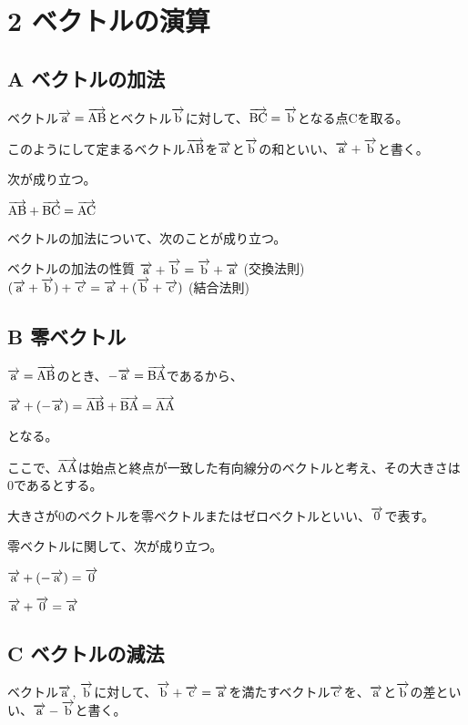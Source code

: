 \documentclass[pulatex,dvpdfmx,a4paper]{jsarticle}
\newcommand{\bekutoru}[1]{\overrightarrow{\rm #1}}
\begin{document}
\section*{2 ベクトルの演算}
\subsection*{A ベクトルの加法}

ベクトル$\bekutoru{a}=\bekutoru{AB}$とベクトル$\bekutoru{b}$に対して、$\bekutoru{BC}=\bekutoru{b}$となる点Cを取る。\par
このようにして定まるベクトル$\bekutoru{AB}$を$\bekutoru{a}$と$\bekutoru{b}$の和といい、$\bekutoru{a}+\bekutoru{b}$と書く。\par
次が成り立つ。
\begin{screen}
  $\bekutoru{AB}+\bekutoru{BC}=\bekutoru{AC}$
\end{screen}

ベクトルの加法について、次のことが成り立つ。
\begin{itembox}[l]{ベクトルの加法の性質}
  $\bekutoru{a}+\bekutoru{b}=\bekutoru{b}+\bekutoru{a}$ (交換法則)
  $(\bekutoru{a}+\bekutoru{b})+\bekutoru{c}=\bekutoru{a}+(\bekutoru{b}+\bekutoru{c})$ (結合法則)
\end{itembox}

\subsection*{B 零ベクトル}
$\bekutoru{a}=\bekutoru{AB}$のとき、$-\bekutoru{a}=\bekutoru{BA}$であるから、\par
$\bekutoru{a}+(-\bekutoru{a})=\bekutoru{AB}+\bekutoru{BA}=\bekutoru{AA}$\par となる。\par
ここで、$\bekutoru{AA}$は始点と終点が一致した有向線分のベクトルと考え、その大きさは0であるとする。\par
大きさが0のベクトルを零ベクトルまたはゼロベクトルといい、$\bekutoru{0}$で表す。\par
零ベクトルに関して、次が成り立つ。
\begin{screen}
  $\bekutoru{a}+(-\bekutoru{a})=\bekutoru{0}$\par
  $\bekutoru{a}+\bekutoru{0}=\bekutoru{a}$
\end{screen}

\subsection*{C ベクトルの減法}
ベクトル$\bekutoru{a}$, $\bekutoru{b}$に対して、$\bekutoru{b}+\bekutoru{c}=\bekutoru{a}$を満たすベクトル$\bekutoru{c}$を、$\bekutoru{a}$と$\bekutoru{b}$の差といい、$\bekutoru{a}-\bekutoru{b}$と書く。\par
\end{document}
